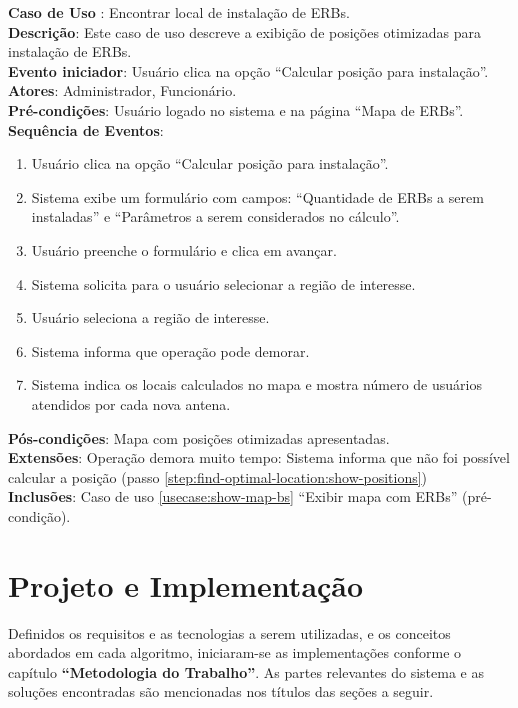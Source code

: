 \documentclass[]{politex}
\begin{document}
\noindent \textbf{Caso de Uso }: Encontrar local de instalação de ERBs. \\
\textbf{Descrição}: Este caso de uso descreve a exibição de posições otimizadas
para instalação de ERBs. \\
\textbf{Evento iniciador}: Usuário clica na opção ``Calcular posição para instalação''. \\
\textbf{Atores}: Administrador, Funcionário. \\
\textbf{Pré-condições}: Usuário logado no sistema e na página ``Mapa de ERBs''. \\
\textbf{Sequência de Eventos}:
\begin{enumerate}
\item Usuário clica na opção ``Calcular posição para instalação''.
\item Sistema exibe um formulário com campos: ``Quantidade de ERBs a serem
instaladas'' e ``Parâmetros a serem considerados no cálculo''.
\item Usuário preenche o formulário e clica em avançar.
\item Sistema solicita para o usuário selecionar a região de interesse.
\item Usuário seleciona a região de interesse.
\item Sistema informa que operação pode demorar.
\item\label{step:find-optimal-location:show-positions} Sistema indica os locais calculados no mapa e mostra número de usuários atendidos por cada nova antena.
\end{enumerate}
\textbf{Pós-condições}: Mapa com posições otimizadas apresentadas. \\
\textbf{Extensões}: Operação demora muito tempo: Sistema informa que não foi
possível calcular a posição (passo \ref{step:find-optimal-location:show-positions}) \\
\textbf{Inclusões}: Caso de uso \ref{usecase:show-map-bs} ``Exibir mapa com ERBs'' (pré-condição). \\

\chapter{Projeto e Implementação}

Definidos os requisitos e as tecnologias a serem utilizadas, e os conceitos
abordados em cada algoritmo, iniciaram-se as implementações conforme o capítulo
\textbf{``Metodologia do Trabalho''}. As partes relevantes do sistema e as
soluções encontradas são mencionadas nos títulos das seções a seguir.
\end{document}
